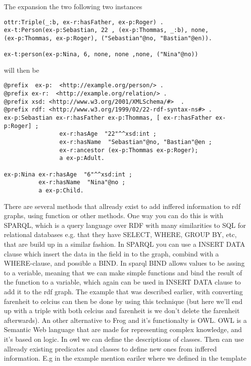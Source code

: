 The expansion the two following two instances

\begin{lstlisting}[frame=single]
ottr:Triple(_:b, ex-r:hasFather, ex-p:Roger) .
ex-t:Person(ex-p:Sebastian, 22 , (ex-p:Thommas, _:b), none, 
(ex-p:Thommas, ex-p:Roger), ("Sebastian"@no, "Bastian"@en)).

ex-t:person(ex-p:Nina, 6, none, none ,none, ("Nina"@no))
\end{lstlisting}

will then be
\begin{lstlisting}[frame=single, language=turtle]
@prefix  ex-p:  <http://example.org/person/> . 
@prefix ex-r:  <http://example.org/relation/> . 
@prefix xsd: <http://www.w3.org/2001/XMLSchema/#>  . 
@prefix rdf: <http://www.w3.org/1999/02/22-rdf-syntax-ns#> .
ex-p:Sebastian ex-r:hasFather ex-p:Thommas, [ ex-r:hasFather ex-p:Roger] ; 
                ex-r:hasAge  "22"^^xsd:int ; 
                ex-r:hasName  "Sebastian"@no, "Bastian"@en ;
                ex-r:ancestor (ex-p:Thommas ex-p:Roger);
                a ex-p:Adult.

ex-p:Nina ex-r:hasAge  "6"^^xsd:int ; 
          ex-r:hasName  "Nina"@no ;
          a ex-p:Child.
\end{lstlisting}
There are several methods that allready exist to add inffered information to rdf graphs, using function or other methods. 
One way you can do this is with SPARQL, which is a query language over RDF with many similarities to SQL for relational 
databases e.g. that they have SELECT, WHERE, GROUP BY, etc, that are build up in a similar fashion. In SPARQL you can use 
a INSERT DATA clause which insert the data in the field in to the graph, combind with a WHERE-clause, and possible a BIND. 
In sparql BIND allows values to be assing to a veriable, meaning that we can make simple functions and bind the result of 
the function to a variable, which again can be used in INSERT DATA clause to add it to the rdf graph. The example that was
described earlier, with converting farenheit to celcius can then be done by using this technique (but here we'll end up with a 
triple with both celcius and farenheit is we don't delete the farenheit afterwards). 
An other alternative to Frog and it's functionalty is OWL. OWL is a Semantic Web language that are made for representing complex 
knowledge, and it's based on logic. In owl we can define the descriptions of classes. Then can use allready existing 
predicates and classes to define new ones from inffered information. E.g in the example mention eariler where we defined in the template
